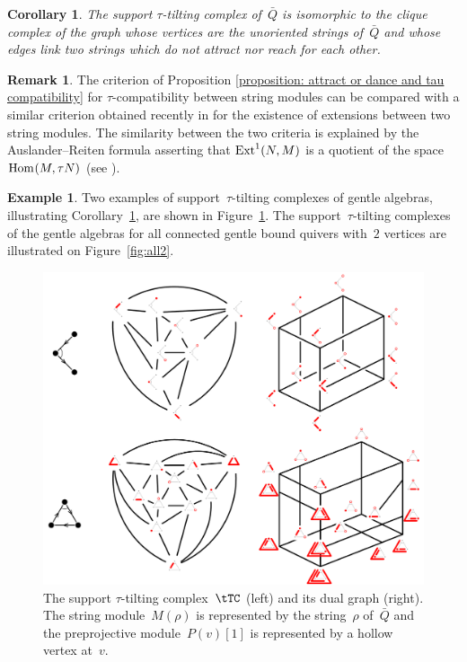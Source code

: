 \documentclass{amsart}
\newtheorem{corollary}[theorem]{Corollary}
\theoremstyle{definition}
\newtheorem{example}[theorem]{Example}
\newtheorem{remark}[theorem]{Remark}
\newcommand{\fref}[1]{Figure~\ref{#1}} %
\newcommand{\Hom}[1]{\operatorname{{\rm Hom}}_{#1}}
\newcommand{\Ext}[1]{\operatorname{{\rm Ext}}_{#1}}
\begin{document}
\begin{corollary}
\label{coro: stautilt complex from strings}
The support $\tau$-tilting complex of~$\bar Q$ is isomorphic to the clique complex of the graph whose vertices are the unoriented strings of~$\bar Q$ and whose edges link two strings which do not attract nor reach for each other.
\end{corollary}

\begin{remark}
The criterion of Proposition \ref{proposition: attract or dance and tau compatibility} for $\tau$-compatibility between string modules can be compared with a similar criterion obtained recently in \cite{CanakciPauksztelloSchroll} for the existence of extensions between two string modules.
The similarity between the two criteria is explained by the Auslander--Reiten formula asserting that $\Ext{}^1(N,M)$ is a quotient of the space $\Hom{}(M,\tau N)$ (see \cite[Theorem IV.2.13]{AssemSimsonSkowronski}).
\end{remark}


\begin{example}
Two examples of support~$\tau$-tilting complexes of gentle algebras, illustrating Corollary~\ref{coro: stautilt complex from strings}, are shown in Figure~\ref{fig:exmtTC}.
The support~$\tau$-tilting complexes of the gentle algebras for all connected gentle bound quivers with~$2$ vertices are illustrated on \fref{fig:all2}.

\begin{figure}[h]
	\capstart
	\centerline{\includegraphics[scale=.5]{exmtTC}}
	\caption{The support $\tau$-tilting complex~$\tTC$ (left) and its dual graph (right). The string module~$M(\rho)$ is represented by the string~$\rho$ of~$\bar Q$ and the preprojective module~$P(v)[1]$ is represented by a hollow vertex at~$v$.}
	\label{fig:exmtTC}
\end{figure}
\end{example}
\end{document}
